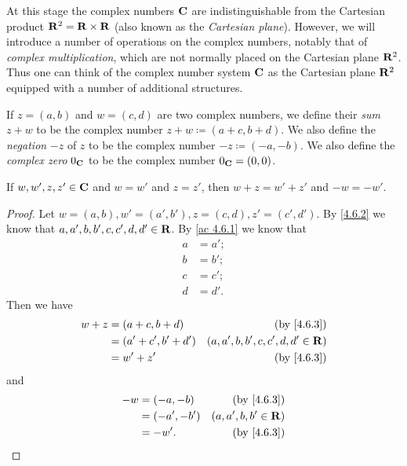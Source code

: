 \begin{note}
  At this stage the complex numbers \(\mathbf{C}\) are indistinguishable from the Cartesian product \(\mathbf{R}^2 = \mathbf{R} \times \mathbf{R}\)
  (also known as the \emph{Cartesian plane}).
  However, we will introduce a number of operations on the complex numbers, notably that of \emph{complex multiplication}, which are not normally placed on the Cartesian plane \(\mathbf{R}^2\).
  Thus one can think of the complex number system \(\mathbf{C}\) as the Cartesian plane \(\mathbf{R}^2\) equipped with a number of additional structures.
\end{note}

\begin{definition}\label{4.6.3}
  If \(z = (a, b)\) and \(w = (c, d)\) are two complex numbers, we define their \emph{sum} \(z + w\) to be the complex number \(z + w \coloneqq (a + c, b + d)\).
  We also define the \emph{negation} \(-z\) of \(z\) to be the complex number \(-z \coloneqq (-a, -b)\).
  We also define the \emph{complex zero} \(0_{\mathbf{C}}\) to be the complex number \(0_{\mathbf{C}} = (0, 0)\).
\end{definition}

\begin{additional corollary}\label{ac 4.6.2}
If \(w, w', z, z' \in \mathbf{C}\) and \(w = w'\) and \(z = z'\), then \(w + z = w' + z'\) and \(-w = -w'\).
\end{additional corollary}

\begin{proof}
  Let \(w = (a, b), w' = (a', b'), z = (c, d), z' = (c', d')\).
  By \cref{4.6.2} we know that \(a, a', b, b', c, c', d, d' \in \mathbf{R}\).
  By \cref{ac 4.6.1} we know that
  \begin{align*}
    a & = a'; \\
    b & = b'; \\
    c & = c'; \\
    d & = d'.
  \end{align*}
  Then we have
  \begin{align*}
    w + z & = (a + c, b + d)     & \text{(by \cref{4.6.3})}            \\
          & = (a' + c', b' + d') & (a, a', b, b', c, c', d, d' \in \R) \\
          & = w' + z'            & \text{(by \cref{4.6.3})}
  \end{align*}
  and
  \begin{align*}
    -w & = (-a, -b)   & \text{(by \cref{4.6.3})} \\
       & = (-a', -b') & (a, a', b, b' \in \R)    \\
       & = -w'.       & \text{(by \cref{4.6.3})}
  \end{align*}
\end{proof}

